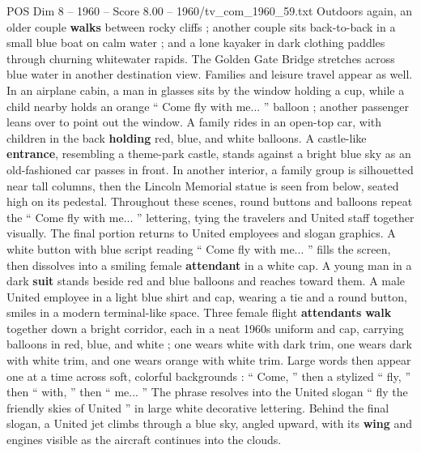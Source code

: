 \begin{textsample}{POS Dim 8 – 1960 – Score 8.00 – 1960/tv\_com\_1960\_59.txt}
Outdoors again, an older couple \textbf{walks} between rocky cliffs ; another couple sits back-to-back in a small blue boat on calm water ; and a lone kayaker in dark clothing paddles through churning whitewater rapids.
The Golden Gate Bridge stretches across blue water in another destination view.
Families and leisure travel appear as well.
In an airplane cabin, a man in glasses sits by the window holding a cup, while a child nearby holds an orange “ Come fly with me... ” balloon ; another passenger leans over to point out the window.
A family rides in an open-top car, with children in the back \textbf{holding} red, blue, and white balloons.
A castle-like \textbf{entrance}, resembling a theme-park castle, stands against a bright blue sky as an old-fashioned car passes in front.
In another interior, a family group is silhouetted near tall columns, then the Lincoln Memorial statue is seen from below, seated high on its pedestal.
Throughout these scenes, round buttons and balloons repeat the “ Come fly with me... ” lettering, tying the travelers and United staff together visually.
The final portion returns to United employees and slogan graphics.
A white button with blue script reading “ Come fly with me... ” fills the screen, then dissolves into a smiling female \textbf{attendant} in a white cap.
A young man in a dark \textbf{suit} stands beside red and blue balloons and reaches toward them.
A male United employee in a light blue shirt and cap, wearing a tie and a round button, smiles in a modern terminal-like space.
Three female flight \textbf{attendants} \textbf{walk} together down a bright corridor, each in a neat 1960s uniform and cap, carrying balloons in red, blue, and white ; one wears white with dark trim, one wears dark with white trim, and one wears orange with white trim.
Large words then appear one at a time across soft, colorful backgrounds : “ Come, ” then a stylized “ fly, ” then “ with, ” then “ me... ” The phrase resolves into the United slogan “ fly the friendly skies of United ” in large white decorative lettering.
Behind the final slogan, a United jet climbs through a blue sky, angled upward, with its \textbf{wing} and engines visible as the aircraft continues into the clouds.

\end{textsample}
